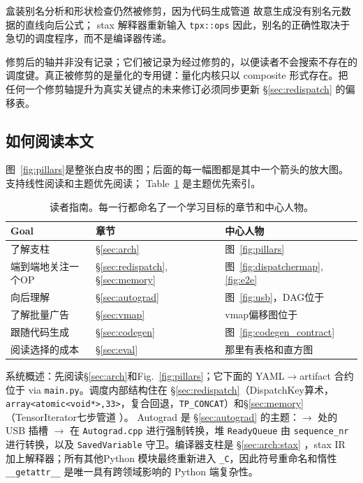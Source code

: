 盒装别名分析和形状检查仍然被修剪，因为代码生成管道
 故意生成没有别名元数据的直线向后公式； stax 解释器重新输入 \texttt{tpx::ops}
 因此，别名的正确性取决于急切的调度程序，而不是编译器传递。

修剪后的轴并非没有记录；它们被记录为经过修剪的，以便读者不会搜索不存在的调度键。真正被修剪的是量化的专用键：量化内核只以 composite 形式存在。把任何一个修剪轴提升为真实关键点的未来修订必须同步更新 \S\ref{sec:redispatch} 的偏移表。

\subsection{如何阅读本文}
\label{sec:intro:howto}

图~\ref{fig:pillars}是整张白皮书的图；后面的每一幅图都是其中一个箭头的放大图。支持线性阅读和主题优先阅读； Table~\ref{tab:intro:guide} 是主题优先索引。

\begin{table}[H]
\centering
\caption{读者指南。每一行都命名了一个学习目标的章节和中心人物。}
\label{tab:intro:guide}
\small
\begin{tabular}{p{3.2cm}p{4.2cm}p{4.2cm}}
\toprule
Goal & 章节 & 中心人物 \\
\midrule
了解支柱 & \S\ref{sec:arch} & 图~\ref{fig:pillars} \\
端到端地关注一个OP & \S\ref{sec:redispatch}, \S\ref{sec:memory} & 图~\ref{fig:dispatchermap}, \ref{fig:e2e} \\
向后理解 & \S\ref{sec:autograd} & 图~\ref{fig:usb}，DAG位于 \\
了解批量广告 & \S\ref{sec:vmap} & vmap偏移图位于 \\
跟随代码生成 & \S\ref{sec:codegen} & 图~\ref{fig:codegen_contract} \\
阅读选择的成本 & \S\ref{sec:eval} & 那里有表格和直方图 \\
\bottomrule
\end{tabular}
\end{table}

系统概述：先阅读\S\ref{sec:arch}和Fig.~\ref{fig:pillars}；它下面的 YAML$\rightarrow$artifact 合约位于 via \texttt{main.py}。调度内部结构住在
\S\ref{sec:redispatch}（DispatchKey算术，\texttt{array<atomic<void*>,33>}，复合回退，\texttt{TP\_CONCAT}）和\S\ref{sec:memory}（TensorIterator七步管道
）。 Autograd 是 \S\ref{sec:autograd} 的主题：$\rightarrow$ 处的 USB 插槽
$\rightarrow$ 在 \texttt{Autograd.cpp} 进行强制转换，堆 \texttt{ReadyQueue} 由 \texttt{sequence\_nr} 进行转换，以及
\texttt{SavedVariable} 守卫。编译器支柱是 \S\ref{sec:arch:stax} ，stax IR 加上解释器；所有其他Python
模块最终重新进入 \texttt{\_C}，因此符号重命名和惰性 \texttt{\_\_getattr\_\_}
是唯一具有跨领域影响的 Python 端复杂性。

